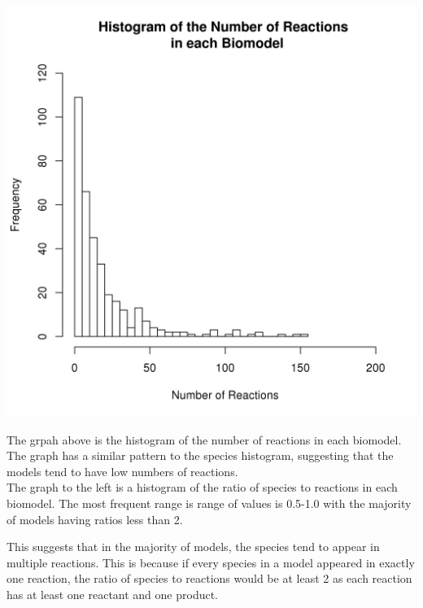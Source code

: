 \documentclass[portrait,a1paper,fontscale=0.5]{baposter}
\begin{document}
\begin{poster}
{\begin{multicols}{2}
 \includegraphics[trim= 1.5mm 5mm 5mm 5mm, clip, scale=0.4]{Poster-images/ReactionsHistogram.png} 
  
  The grpah above is the histogram of the number of reactions in each biomodel. The graph has a similar pattern to the species histogram, suggesting that the models tend to have low numbers of reactions.\\
   
 The graph to the left is a histogram of the ratio of species to reactions in each biomodel. The most frequent range is range of values is 0.5-1.0 with the majority of models having ratios less than 2.
 
 This suggests that in the majority of models, the species tend to appear in multiple reactions. This is because if every species in a model appeared in exactly one reaction, the ratio of species to reactions would be at least 2 as each reaction has at least one reactant and one product.
 
 \end{multicols}
 }
 

\end{poster}
\end{document}
